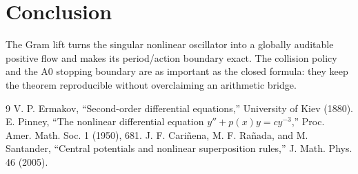 \documentclass[10pt]{article}
\begin{document}
\section{Conclusion}
The Gram lift turns the singular nonlinear oscillator into a globally auditable
positive flow and makes its period/action boundary exact.  The collision policy
and the A0 stopping boundary are as important as the closed formula: they keep
the theorem reproducible without overclaiming an arithmetic bridge.

\begin{thebibliography}{9}
 V. P. Ermakov, ``Second-order differential equations,''
University of Kiev (1880).
 E. Pinney, ``The nonlinear differential equation
$y''+p(x)y=cy^{-3}$,'' Proc. Amer. Math. Soc. 1 (1950), 681.
 J. F. Cari\~nena, M. F. Rañada, and M. Santander,
``Central potentials and nonlinear superposition rules,'' J. Math. Phys. 46
(2005).
\end{thebibliography}
\end{document}
